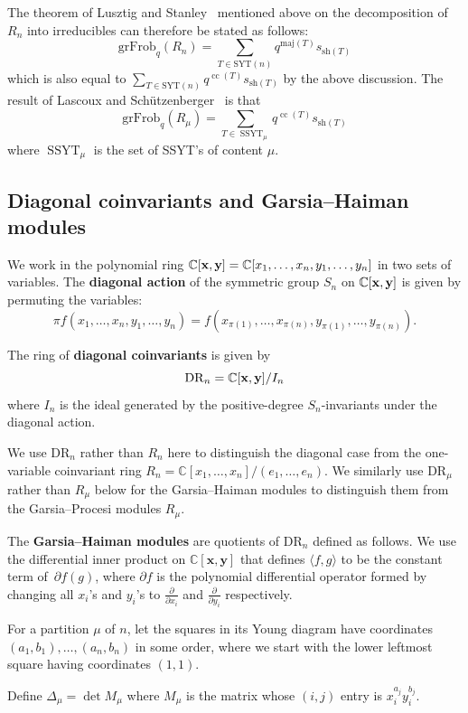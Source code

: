 \documentclass[ALCO,Unicode]{cedram}
\DeclareMathOperator{\cc}{cc}
\DeclareMathOperator{\SSYT}{SSYT}
\newcommand{\SYT}{\mathrm{SYT}}
\newcommand{\sh}{\mathrm{sh}}
\newcommand{\maj}{\mathrm{maj}}
\newcommand{\DR}{\mathrm{DR}}
\newcommand{\CC}{\mathbb{C}}
\newcommand{\grFrob}{\mathrm{grFrob}}
\begin{document}
The theorem of Lusztig and Stanley~\cite{Stanley} mentioned above on the decomposition of~$R_n$ into irreducibles can therefore be stated as follows:
$$\grFrob_q(R_n)=\sum_{T\in \SYT(n)} q^{\maj(T)}s_{\sh(T)}$$
which is also equal to $\sum_{T\in \SYT(n)} q^{\cc(T)}s_{\sh(T)}$ by the above discussion. The result of Lascoux and Sch\"utzenberger~\cite{LascouxSchutzenberger} is that $$\grFrob_q(R_\mu)=\sum_{T\in \SSYT_\mu} q^{\cc(T)}s_{\sh(T)}$$ where $\SSYT_\mu$ is the set of SSYT's of content $\mu$.  

\subsection{Diagonal coinvariants and Garsia--Haiman modules}\label{sec:GH}

We work in the polynomial ring $\CC[{\bf x}, {\bf y}]=\CC[x_1,\ldots,x_n,y_1,\ldots,y_n]$ in two sets of variables.  The \textbf{diagonal action} of the symmetric group $S_n$ on $\CC[\bf x,\bf y]$ is given by permuting the variables: $$\pi f(x_1,\ldots,x_n,y_1,\ldots,y_n)=f(x_{\pi(1)},\ldots,x_{\pi(n)},y_{\pi(1)},\ldots, y_{\pi(n)}).$$

\begin{definition}
	The ring of \textbf{diagonal coinvariants} is given by $$\DR_n=\CC[{\bf x}, {\bf y}]/I_n$$ where $I_n$ is the ideal generated by the positive-degree $S_n$-invariants under the diagonal action.
\end{definition}

\begin{remark}
	We use $\DR_n$ rather than $R_n$ here to distinguish the diagonal case from the one-variable coinvariant ring $R_n=\CC[x_1,\ldots,x_n]/(e_1,\ldots,e_n)$.  We similarly use $\DR_\mu$ rather than $R_\mu$ below for the Garsia--Haiman modules to distinguish them from the Garsia--Procesi modules $R_\mu$.  
\end{remark}

The \textbf{Garsia--Haiman modules} are quotients of $\DR_n$ defined as follows.  We use the differential inner product on $\CC[\mathbf{x},\mathbf{y}]$ that defines $\langle f, g \rangle$ to be the constant term of~$\partial f(g)$, where $\partial f$ is the polynomial differential operator formed by changing all $x_i$'s and $y_i$'s to $\frac{\partial}{\partial x_i}$ and $\frac{\partial}{\partial y_i}$ respectively.



\begin{definition}
	For a partition $\mu$ of $n$, let the squares in its Young diagram have coordinates $(a_1,b_1),\ldots,(a_n,b_n)$ in some order, where we start with the lower leftmost square having coordinates $(1,1)$. 
	
	Define $\Delta_\mu=\det M_\mu$ where $M_\mu$ is the matrix whose $(i,j)$ entry is $x_i^{a_j}y_i^{b_j}$.
\end{definition}
\end{document}
